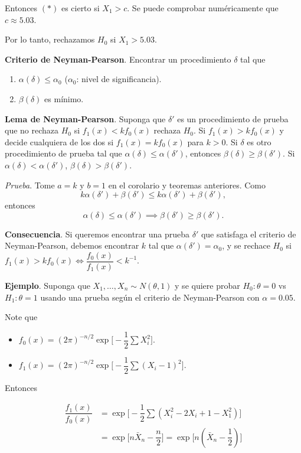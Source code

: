 \documentclass[
  12pt,
]{book}
\providecommand{\tightlist}{%
  \setlength{\itemsep}{0pt}\setlength{\parskip}{0pt}}
\begin{document}
Entonces \((*)\) es cierto si \(X_1>c\). Se puede comprobar numéricamente que \(c\approx5.03\).

Por lo tanto, rechazamos \(H_0\) si \(X_1>5.03\).

\textbf{Criterio de Neyman-Pearson}. Encontrar un procedimiento \(\delta\) tal que

\begin{enumerate}
\def\labelenumi{\arabic{enumi})}
\item
  \(\alpha(\delta) \leq \alpha_0\) (\(\alpha_0\): nivel de significancia).
\item
  \(\beta(\delta)\) es mínimo.
\end{enumerate}

\textbf{Lema de Neyman-Pearson}. Suponga que \(\delta'\) es un procedimiento de prueba que no rechaza \(H_0\) si \(f_1(x)<kf_0(x)\) rechaza \(H_0\). Si \(f_1(x)>kf_0(x)\) y decide cualquiera de los dos si \(f_1(x)=kf_0(x)\) para \(k>0\). Si \(\delta\) es otro procedimiento de prueba tal que \(\alpha(\delta)\leq \alpha(\delta')\), entonces \(\beta(\delta)\geq \beta(\delta')\). Si \(\alpha(\delta) <\alpha(\delta')\), \(\beta(\delta)> \beta(\delta')\).

\emph{Prueba}. Tome \(a=k\) y \(b=1\) en el corolario y teoremas anteriores. Como
\[k\alpha(\delta')+\beta(\delta')\leq k\alpha(\delta')+\beta(\delta'),\]
entonces
\[\alpha(\delta)\leq \alpha(\delta')\implies \beta(\delta')\geq \beta(\delta').\]

\textbf{Consecuencia}. Si queremos encontrar una prueba \(\delta'\) que satisfaga el criterio de Neyman-Pearson, debemos encontrar \(k\) tal que \(\alpha(\delta') = \alpha_0\), y se rechace \(H_0\) si \(f_1(x)>kf_0(x) \Leftrightarrow\dfrac{f_0(x)}{f_1(x)}<k^{-1}\).

\textbf{Ejemplo}. Suponga que \(X_1,\dots,X_n\sim N(\theta,1)\) y se quiere probar \(H_0: \theta = 0\) vs \(H_1: \theta = 1\) usando una prueba según el criterio de Neyman-Pearson con \(\alpha = 0.05\).

Note que

\begin{itemize}
\tightlist
\item
  \(f_0(x) = (2\pi)^{-n/2}\exp\bigg[-\dfrac 12 \sum X_i^2\bigg]\).
\item
  \(f_1(x) = (2\pi)^{-n/2}\exp\bigg[-\dfrac 12 \sum (X_i-1)^2\bigg]\).
\end{itemize}

Entonces

\begin{align*}
\dfrac{f_1(x)}{f_0(x)}& = \exp\bigg[-\dfrac 12 \sum (X_i^2-2X_i+1-X_1^2)\bigg]\\
& = \exp\bigg[n\bar X_n - \dfrac n2\bigg] = \exp\bigg[n\left(\bar X_n - \dfrac 12\right)\bigg] 
\end{align*}
\end{document}
